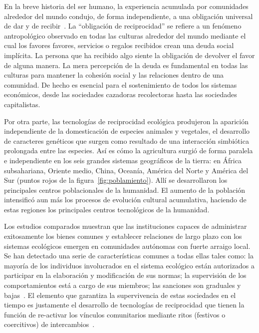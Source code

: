 \documentclass[a4paper,11pt]{book}
\theoremstyle{definition}
\begin{document}

En la breve historia del ser humano, la experiencia acumulada por comunidades alrededor del mundo condujo, de forma independiente, a una obligaci\'on universal de dar y de recibir~\cite{mauss1923-leDon}.
%
La ``obligaci\'on de reciprocidad'' se refiere a un fen\'omeno antropol\'ogico observado en todas las culturas alrededor del mundo mediante el cual los favores favores, servicios o regalos recibidos crean una deuda social impl\'icita.
%
La persona que ha recibido algo siente la obligaci\'on de devolver el favor de alguna manera.
%
La mera percepci\'on de la deuda es fundamental en todas las culturas para mantener la cohesi\'on social y las relaciones dentro de una comunidad.
%
De hecho es esencial para el sostenimiento de todos los sistemas econ\'omicos, desde las sociedades cazadoras recolectoras hasta las sociedades capitalistas.


Por otra parte, las tecnolog\'ias de reciprocidad ecol\'ogica produjeron la aparici\'on independiente de la domesticaci\'on de especies animales y vegetales, el desarrollo de caracteres gen\'eticos que surgen como resultado de una interacci\'on simbi\'otica prolongada entre las especies.
%
As\'i es c\'omo la agricultura surgi\'o de forma paralela e independiente en los seis grandes sistemas geogr\'aficos de la tierra: en \'Africa subsahariana, Oriente medio, China, Ocean\'ia, Am\'erica del Norte y Am\'erica del Sur (puntos rojos de la figura~\ref{fig:poblamiento}).
%
All\'i se desarrollaron los principales centros poblacionales de la humanidad.
El aumento de la poblaci\'on intensific\'o aun m\'as los procesos de evoluci\'on cultural acumulativa, haciendo de estas regiones los principales centros tecnol\'ogicos de la humanidad.


Los estudios comparados muestran que las instituciones capaces de administrar exitosamente los bienes comunes y establecer relaciones de largo plazo con los sistemas ecol\'ogicos emergen en comunidades aut\'onomas con fuerte arraigo local.
%
Se han detectado una serie de caracter\'isticas comunes a todas ellas tales como: la mayor\'ia de los individuos involucrados en el sistema ecol\'ogico est\'an autorizados a participar en la elaboraci\'on y modificaci\'on de sus normas; la supervisi\'on de los comportamientos est\'a a cargo de sus miembros; las sanciones son graduales y bajas~\cite{ostrom2010}.
%
El elemento que garantiza la supervivencia de estas sociedades en el tiempo es justamente el desarrollo de tecnolog\'ias de reciprocidad que tienen la funci\'on de re-activar los v\'inculos comunitarios mediante ritos (festivos o coercitivos) de intercambios~\cite{segato2016-guerraContraLasMujeres,zaffaroni2013-cuestionCriminal}.
\end{document}
